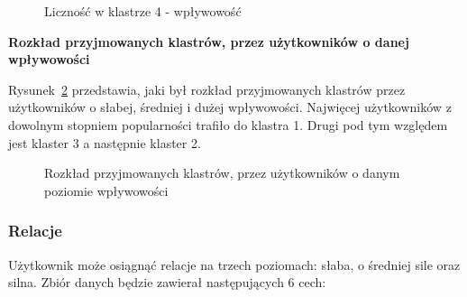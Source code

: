 \documentclass[polish,12pt]{aghthesis}
\begin{document}
\begin{itemize}
        \begin{figure}[ht] 
    \centering
    \hfill%
    \caption{Liczność w klastrze 4 - wpływowość}
    \label{f:4i}
    \end{figure}

    
\end{itemize}


\FloatBarrier


\textbf{Rozkład przyjmowanych klastrów, przez użytkowników o danej wpływowości}

\vspace{5mm}
 
 Rysunek~\ref{pie:i} przedstawia, jaki był rozkład przyjmowanych klastrów przez użytkowników o słabej, średniej i dużej wpływowości. Najwięcej użytkowników z dowolnym stopniem popularności trafiło do klastra 1. Drugi pod tym względem jest klaster 3 a następnie klaster 2. 
 
  \begin{figure}

\begin{minipage}{.5\linewidth}
\centering
{}
\end{minipage}%
\begin{minipage}{.5\linewidth}
\centering
{}
\end{minipage}\par\medskip
\centering
{}

\caption{Rozkład przyjmowanych klastrów, przez użytkowników o danym poziomie wpływowości}
\label{pie:i}
\end{figure}


\FloatBarrier



\subsubsection{Relacje}

Użytkownik może osiągnąć relacje na trzech poziomach: słaba, o średniej sile oraz silna. Zbiór danych będzie zawierał następujących 6 cech:
\end{document}
